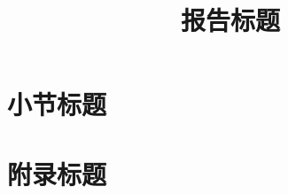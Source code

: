 \documentclass[chinese]{iarticle}
\title{报告标题}
\begin{document}
\begin{abstract}
  \lipsum[1]
\end{abstract}

\tableofcontents

\section{小节标题}

\lipsum[2]

\appendix

\section{附录标题}

\lipsum[3]
\end{document}
